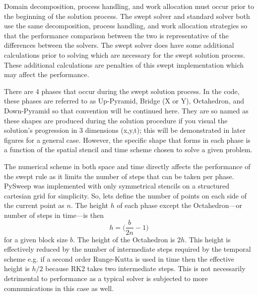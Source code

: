 \documentclass[review]{elsarticle}
\begin{document}
\par Domain decomposition, process handling, and work allocation must occur prior to the beginning of the solution process. The swept solver and standard solver both use the same decomposition, process handling, and work allocation strategies so that the performance comparison between the two is representative of the differences between the solvers. The swept solver does have some additional calculations prior to solving which are necessary for the swept solution process. These additional calculations are penalties of this swept implementation which may affect the performance. 

\par
There are 4 phases that occur during the swept solution process. In the code, these phases are referred to as Up-Pyramid, Bridge (X or Y), Octahedron, and Down-Pyramid so that convention will be continued here. They are so named as these shapes are produced during the solution procedure if you visual the solution's progression in 3 dimensions (x,y,t); this will be demonstrated in later figures for a general case. However, the specific shape that forms in each phase is a function of the spatial stencil and time scheme chosen to solve a given problem.  

\par
The numerical scheme in both space and time directly affects the performance of the swept rule as it limits the number of steps that can be taken per phase. PySweep was implemented with only symmetrical stencils on a structured cartesian grid for simplicity. So, lets define the number of points on each side of the current point as $n$. The height $h$ of each phase except the Octahedron---or number of steps in time---is then
\begin{equation}
    h = \bigg(\frac{b}{2n}-1\bigg)
\end{equation}
for a given block size $b$. The height of the Octahedron is $2h$. This height is effectively reduced by the number of intermediate steps required by the temporal scheme e.g. if a second order Runge-Kutta is used in time then the effective height is $h/2$ because RK2 takes two intermediate steps. This is not necessarily detrimental to performance as a typical solver is subjected to more communications in this case as well.
\end{document}
